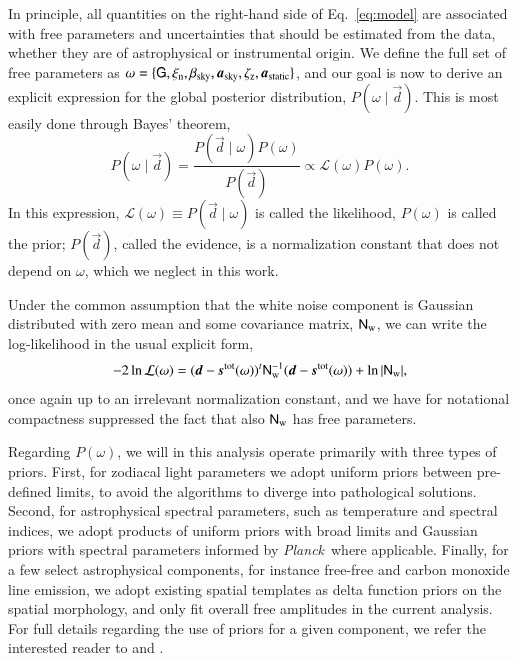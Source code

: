 \documentclass{aa}
\def\Planck{\textit{Planck}}
\newcommand{\dv}[0]{\vec{d}}
\renewcommand{\G}[0]{\tens{G}}
\newcommand{\s}[0]{\vec{s}}
\renewcommand{\a}[0]{\vec{a}}
\newcommand{\N}[0]{\tens{N}}
\begin{document}
In principle, all quantities on the right-hand side of
Eq.~\eqref{eq:model} are associated with free parameters and
uncertainties that should be estimated from the data, whether they are
of astrophysical or instrumental origin. We define the full set of
free parameters as $\omega = \{\G,\xi_{\mathrm{n}},
\beta_{\mathrm{sky}},\a_{\mathrm{sky}},\zeta_{\mathrm{z}},\a_{\mathrm{static}}\}$,
and our goal is now to derive an explicit expression for the global
posterior distribution, $P(\omega\mid\dv)$. This is most easily done
through Bayes' theorem,
\begin{equation}
P(\omega\mid\dv) = \frac{P(\dv\mid\omega) P(\omega)}{P(\dv)} \propto
\mathcal{L}(\omega) P(\omega).
\end{equation}
In this expression, $\mathcal{L}(\omega) \equiv  P(\dv\mid\omega)$ is
called the likelihood, $P(\omega)$ is called the prior; $P(\dv)$, called the evidence, is a
normalization constant that does not depend on $\omega$, which we
neglect in this work.

Under the common assumption that the white noise component is Gaussian
distributed with zero mean and some covariance matrix,
$\N_{\mathrm{w}}$, we can write the log-likelihood in the usual
explicit form,
\begin{equation}
-2\ln\mathcal{L}(\omega) = (\dv-\s^{\mathrm{tot}}(\omega))^t
	\N_{\mathrm{w}}^{-1}(\dv-\s^{\mathrm{tot}}(\omega))+\ln|\N_{\mathrm w}|,
\end{equation}
once again up to an irrelevant normalization constant, and we have for
notational compactness suppressed the fact that also $\N_{\mathrm{w}}$ has free
parameters.

Regarding $P(\omega)$, we will in this analysis operate primarily with
three types of priors. First, for zodiacal light parameters we adopt
uniform priors between pre-defined limits, to avoid the algorithms to
diverge into pathological solutions. Second, for
astrophysical spectral parameters, such as temperature and spectral
indices, we adopt products of uniform priors with broad limits and
Gaussian priors with spectral parameters informed by \Planck\ where
applicable. Finally, for a few select astrophysical components, for
instance free-free and carbon monoxide line emission, we adopt
existing spatial templates as delta function priors on the spatial
morphology, and only fit overall free amplitudes in the current
analysis. For full details regarding the use of priors for a given
component, we refer the interested reader to \citet{CG02_04} and \citet{CG02_05}.
\end{document}
